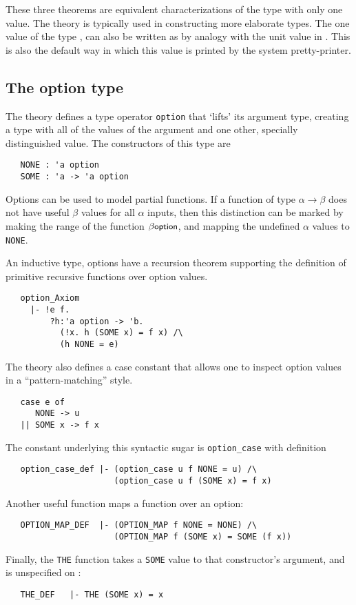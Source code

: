 \noindent These three theorems are equivalent characterizations of the type
with only one value. The theory  is typically used in
constructing more elaborate types.  The one value of the type
, can also be written as \ml{()} by analogy with the unit
value in \ML.  This is also the default way in which this value is
printed by the system pretty-printer.

\subsection{The option type}

The theory  defines a type operator \verb+option+
that `lifts' its argument type, creating a type with all of the
values of the argument and one other, specially distinguished value.
The constructors of this type are
\begin{verbatim}
   NONE : 'a option
   SOME : 'a -> 'a option
\end{verbatim}
Options can be used to model partial functions.  If a function of type
$\alpha\rightarrow\beta$ does not have useful $\beta$ values for all
$\alpha$ inputs, then this distinction can be marked by making the
range of the function $\beta\mbox{\small{\textbf{\sf{option}}}}$, and mapping the
undefined $\alpha$ values to {\small\verb+NONE+}.

An inductive type, options have a recursion theorem supporting the
definition of primitive recursive functions over option values.
%
{\small
\begin{verbatim}
   option_Axiom
     |- !e f.
         ?h:'a option -> 'b.
           (!x. h (SOME x) = f x) /\
           (h NONE = e)
\end{verbatim}
}
The  theory also defines a case constant that allows
one to inspect option values in a ``pattern-matching'' style.
{\small
\begin{verbatim}
   case e of
      NONE -> u
   || SOME x -> f x
\end{verbatim}
}
\noindent
The constant underlying this syntactic sugar is \verb+option_case+
with definition
{\small
\begin{verbatim}
   option_case_def |- (option_case u f NONE = u) /\
                      (option_case u f (SOME x) = f x)
\end{verbatim}
}
\noindent
Another useful function maps a function over an option:
{\small
\begin{verbatim}
   OPTION_MAP_DEF  |- (OPTION_MAP f NONE = NONE) /\
                      (OPTION_MAP f (SOME x) = SOME (f x))
\end{verbatim}
}
Finally, the {\small\verb+THE+} function takes a {\small\verb+SOME+}
value to that constructor's argument, and is unspecified on
:
{\small
\begin{verbatim}
   THE_DEF   |- THE (SOME x) = x
\end{verbatim}
}

